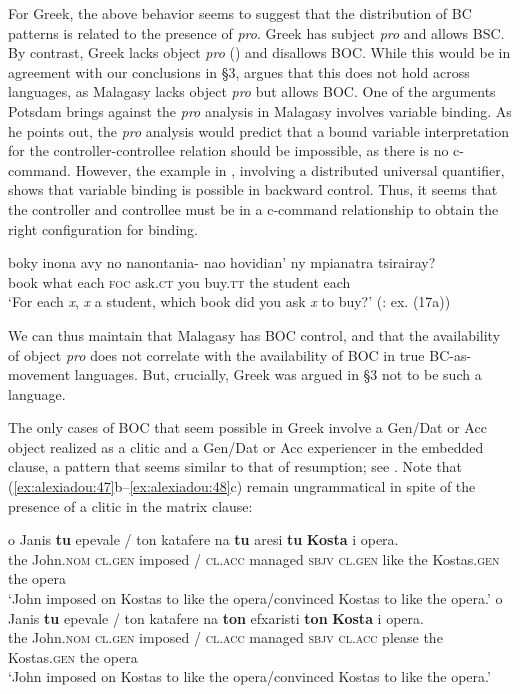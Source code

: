 \documentclass[output=paper]{langsci/langscibook}
\begin{document}
For Greek, the above behavior seems to suggest that the distribution of BC patterns is related to the presence of \textit{pro}. Greek has subject \textit{pro} and allows BSC. By contrast, Greek lacks object \textit{pro} (\citealt{Giannakidou1997}) and disallows BOC. While this would be in agreement with our conclusions in §3, \citet{Potsdam2006Backward,Potsdam2009} argues that this does not hold across languages, as Malagasy lacks object \textit{pro} but allows BOC. One of the arguments Potsdam brings against the \textit{pro} analysis in Malagasy involves variable binding. As he points out, the \textit{pro} analysis would predict that a bound variable interpretation for the controller-controllee relation should be impossible, as there is no c-command. However, the example in , involving a distributed universal quantifier, shows that variable binding is possible in backward control. Thus, it seems that the controller and controllee must be in a c-command relationship to obtain the right configuration for binding. 

\ea%
    \label{ex:alexiadou:49}
    \gll boky inona avy no nanontania- nao hovidian’ ny mpianatra tsirairay?\\
         book what each \textsc{foc}  ask.\textsc{ct}  you buy.\textsc{tt} the student each\\
    \glt ‘For each \textit{x}, \textit{x} a student, which book did you ask \textit{x} to buy?’ (\citealt{Potsdam2006Backward}: ex. (17a))
    \z

We can thus maintain that Malagasy has BOC control, and that the availability of object \textit{pro} does not correlate with the availability of BOC in true BC-as-movement languages. But, crucially, Greek was argued in §3 not to be such a language.

The only cases of BOC that seem possible in Greek involve a Gen\slash Dat or Acc object realized as a clitic and a Gen\slash Dat or Acc experiencer in the embedded clause, a pattern that seems similar to that of resumption; see . Note that (\ref{ex:alexiadou:47}b--\ref{ex:alexiadou:48}c) remain ungrammatical in spite of the presence of a clitic in the matrix clause:\largerpage

\ea%
    \label{ex:alexiadou:50}
    \ea
    \gll o    Janis    \textbf{tu}  epevale / ton katafere   na   \textbf{tu} aresi  \textbf{tu}  \textbf{Kosta}          i opera.\\
                   the John.\textsc{nom}   \textsc{cl.gen}  imposed / \textsc{cl.acc} managed  \textsc{sbjv} \textsc{cl.gen}  like   the Kostas.\textsc{gen} the opera\\
    \glt           ‘John imposed on Kostas to like the opera\slash convinced Kostas to like the opera.’
    \ex
    \gll o    Janis    \textbf{tu}  epevale / ton katafere   na   \textbf{ton} efxaristi  \textbf{ton}  \textbf{Kosta}         i opera.\\
           the John.\textsc{nom} \textsc{cl.gen}  imposed / \textsc{cl.acc} managed  \textsc{sbjv} \textsc{cl.acc}  please the Kostas.\textsc{gen} the opera\\
    \glt   ‘John imposed on Kostas to like the opera\slash convinced Kostas to like the opera.’
    \z
\z
\end{document}
